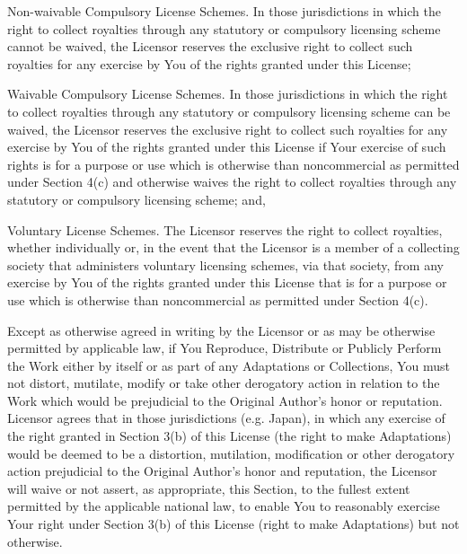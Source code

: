         \startitemize[r]
        \item
            Non-waivable Compulsory License Schemes. In those jurisdictions in which the right to collect royalties through any statutory or compulsory licensing scheme cannot be waived, the Licensor reserves the exclusive right to collect such royalties for any exercise by You of the rights granted under this License;
        \item
            Waivable Compulsory License Schemes. In those jurisdictions in which the right to collect royalties through any statutory or compulsory licensing scheme can be waived, the Licensor reserves the exclusive right to collect such royalties for any exercise by You of the rights granted under this License if Your exercise of such rights is for a purpose or use which is otherwise than noncommercial as permitted under Section 4(c) and otherwise waives the right to collect royalties through any statutory or compulsory licensing scheme; and,
        \item
            Voluntary License Schemes. The Licensor reserves the right to collect royalties, whether individually or, in the event that the Licensor is a member of a collecting society that administers voluntary licensing schemes, via that society, from any exercise by You of the rights granted under this License that is for a purpose or use which is otherwise than noncommercial as permitted under Section 4(c).
        \stopitemize

    \item
    Except as otherwise agreed in writing by the Licensor or as may be otherwise permitted by applicable law, if You Reproduce, Distribute or Publicly Perform the Work either by itself or as part of any Adaptations or Collections, You must not distort, mutilate, modify or take other derogatory action in relation to the Work which would be prejudicial to the Original Author's honor or reputation. Licensor agrees that in those jurisdictions (e.g. Japan), in which any exercise of the right granted in Section 3(b) of this License (the right to make Adaptations) would be deemed to be a distortion, mutilation, modification or other derogatory action prejudicial to the Original Author's honor and reputation, the Licensor will waive or not assert, as appropriate, this Section, to the fullest extent permitted by the applicable national law, to enable You to reasonably exercise Your right under Section 3(b) of this License (right to make Adaptations) but not otherwise.
    \stopitemize

